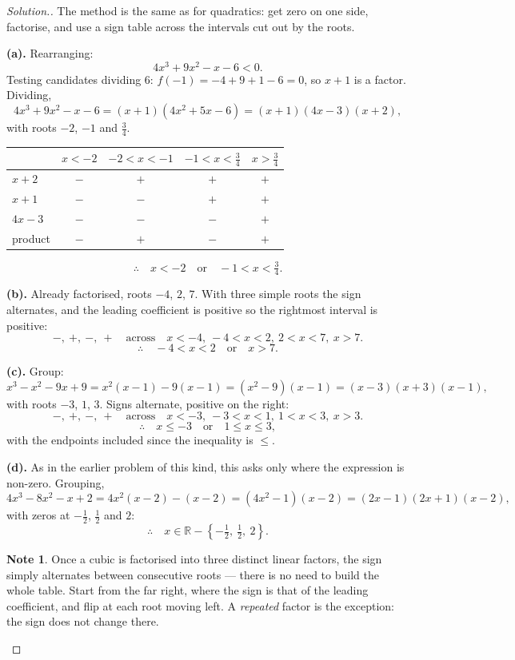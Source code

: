 \documentclass[11pt,a4paper]{article}
\theoremstyle{definition}
\newtheorem{note}[thm]{Note}
\newenvironment{solution}
  {\renewcommand{\qedsymbol}{}\begin{proof}[\textit{Solution}.]}
  {\end{proof}}
\begin{document}
\begin{solution}
The method is the same as for quadratics: get zero on one side, factorise, and use a
sign table across the intervals cut out by the roots.

\textbf{(a).} Rearranging:
$$4x^3+9x^2-x-6<0.$$
Testing candidates dividing $6$: $f(-1)=-4+9+1-6=0$, so $x+1$ is a factor. Dividing,
$$4x^3+9x^2-x-6=(x+1)\left(4x^2+5x-6\right)=(x+1)(4x-3)(x+2),$$
with roots $-2$, $-1$ and $\frac{3}{4}$.

\begin{table}[H]
\centering
\begin{tabular}{|l|c|c|c|c|}
\hline
 & $x<-2$ & $-2<x<-1$ & $-1<x<\frac{3}{4}$ & $x>\frac{3}{4}$\\
\hline
$x+2$ & $-$ & $+$ & $+$ & $+$\\
$x+1$ & $-$ & $-$ & $+$ & $+$\\
$4x-3$ & $-$ & $-$ & $-$ & $+$\\
product & $-$ & $+$ & $-$ & $+$\\
\hline
\end{tabular}
\end{table}

$$\therefore\quad x<-2\quad\text{or}\quad -1<x<\tfrac{3}{4}.$$

\textbf{(b).} Already factorised, roots $-4$, $2$, $7$. With three simple roots the sign
alternates, and the leading coefficient is positive so the rightmost interval is
positive:
$$-,\ +,\ -,\ +\quad\text{across}\quad x<-4,\ -4<x<2,\ 2<x<7,\ x>7.$$
$$\therefore\quad -4<x<2\quad\text{or}\quad x>7.$$

\textbf{(c).} Group:
$$x^3-x^2-9x+9=x^2(x-1)-9(x-1)=\left(x^2-9\right)(x-1)=(x-3)(x+3)(x-1),$$
with roots $-3$, $1$, $3$. Signs alternate, positive on the right:
$$-,\ +,\ -,\ +\quad\text{across}\quad x<-3,\ -3<x<1,\ 1<x<3,\ x>3.$$
$$\therefore\quad x\leq -3\quad\text{or}\quad 1\leq x\leq 3,$$
with the endpoints included since the inequality is $\leq$.

\textbf{(d).} As in the earlier problem of this kind, this asks only where the expression is non-zero. Grouping,
$$4x^3-8x^2-x+2=4x^2(x-2)-(x-2)=\left(4x^2-1\right)(x-2)=(2x-1)(2x+1)(x-2),$$
with zeros at $-\frac{1}{2}$, $\frac{1}{2}$ and $2$:
$$\therefore\quad x\in\mathbb{R}-\left\{-\tfrac{1}{2},\ \tfrac{1}{2},\ 2\right\}.$$

\begin{note}
Once a cubic is factorised into three distinct linear factors, the sign simply
alternates between consecutive roots --- there is no need to build the whole table.
Start from the far right, where the sign is that of the leading coefficient, and flip
at each root moving left. A \emph{repeated} factor is the exception: the sign does not
change there.
\end{note}
\end{solution}
\end{document}
